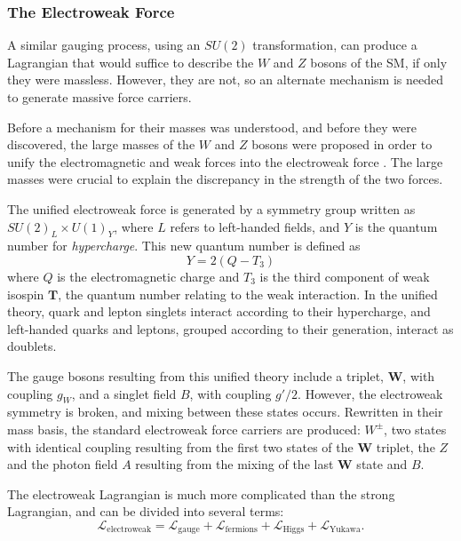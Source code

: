 

\subsubsection{The Electroweak Force}
\label{sec:ew}

A similar gauging process, using an $SU(2)$ transformation, can produce a Lagrangian that would suffice to describe the $W$ and $Z$ bosons of the \ac{SM}, if only they were massless. However, they are not, so an alternate mechanism is needed to generate massive force carriers. 

Before a mechanism for their masses was understood, and before they were discovered, the large masses of the $W$ and $Z$ bosons were proposed in order to unify the electromagnetic and weak forces into the electroweak force \cite{Griffiths:111880}. The large masses were crucial to explain the discrepancy in the strength of the two forces. 

The unified electroweak force is generated by a symmetry group written as ${SU(2)_L \times U(1)_Y}$, where $L$ refers to left-handed fields, and $Y$ is the quantum number for \textit{hypercharge}. This new quantum number is defined as 
%
\begin{equation}
Y = 2(Q - T_3)
\end{equation}
%
where $Q$ is the electromagnetic charge and $T_3$ is the third component of weak isospin $\bm{T}$, the quantum number relating to the weak interaction. In the unified theory, quark and lepton singlets interact according to their hypercharge, and left-handed quarks and leptons, grouped according to their generation, interact as doublets. 

The gauge bosons resulting from this unified theory include a triplet, $\bm{W}$, with coupling $g_W$, and a singlet field $B$, with coupling $g'/2$. However, the electroweak symmetry is broken, and mixing between these states occurs. Rewritten in their mass basis, the standard electroweak force carriers are produced: $W^\pm$, two states with identical coupling resulting from the first two states of the $\bm{W}$ triplet, the $Z$ and the photon field $A$ resulting from the mixing of the last $\bm{W}$ state and $B$. 

The electroweak Lagrangian is much more complicated than the strong Lagrangian, and can be divided into several terms:
%
\begin{equation}
\mathcal{L}_\text{electroweak} = \mathcal{L}_\text{gauge} + \mathcal{L}_\text{fermions} + \mathcal{L}_\text{Higgs} + \mathcal{L}_\text{Yukawa} .
\end{equation}

